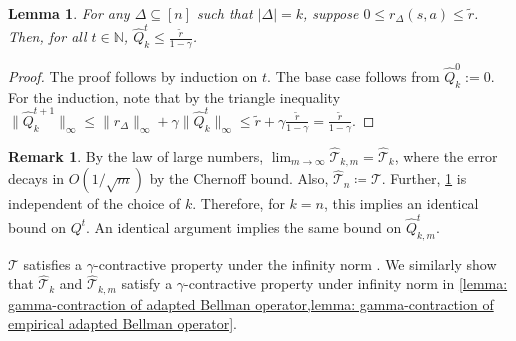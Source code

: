 \documentclass{article}
\theoremstyle{plain}
\newtheorem{lemma}[theorem]{Lemma}
\theoremstyle{definition}
\newtheorem{remark}[theorem]{Remark}
\begin{document}
\begin{lemma}
\label{lemma: Q-bound}
    \emph{For any $\Delta\subseteq[n]$ such that $|\Delta|=k$, suppose $0\leq r_\Delta(s,a)\leq \tilde{r}$. Then, for all $t\in\mathbb{N}$, $\hat{Q}_k^t \leq \frac{\tilde{r}}{1-\gamma}$.}
\end{lemma}
\begin{proof}
    The proof follows by induction on $t$. The base case follows from $\hat{Q}_k^0:=0$. For the induction, note that by the triangle inequality $\|\hat{Q}_k^{t+1}\|_\infty\leq\|r_\Delta\|_\infty + \gamma \|\hat{Q}_k^t\|_\infty \leq \tilde{r} + \gamma \frac{\tilde{r}}{1-\gamma} = \frac{\tilde{r}}{1-\gamma}$.
\end{proof}
\begin{remark}
\label{remark: comparing bellman variants} By the law of large numbers, $\lim_{m\to\infty}\hat{\mathcal{T}}_{k,m} = \hat{\mathcal{T}}_k$, where the error decays in $O(1/\sqrt{m})$ by the Chernoff bound. 
Also, $\hat{\mathcal{T}}_n \coloneq \mathcal{T}$. Further, \cref{lemma: Q-bound} is independent of the choice of $k$. Therefore, for $k=n$, this implies an identical bound on $Q^t$. An identical argument implies the same bound on $\hat{Q}_{k,m}^t$.
\end{remark}


$\mathcal{T}$ satisfies a $\gamma$-contractive property under the infinity norm \citep{Watkins_Dayan_1992}. We similarly show that $\hat{\mathcal{T}}_k$ and $\hat{\mathcal{T}}_{k,m}$ satisfy a $\gamma$-contractive property under infinity norm in \cref{lemma: gamma-contraction of adapted Bellman operator,lemma: gamma-contraction of empirical adapted Bellman operator}.
\end{document}
